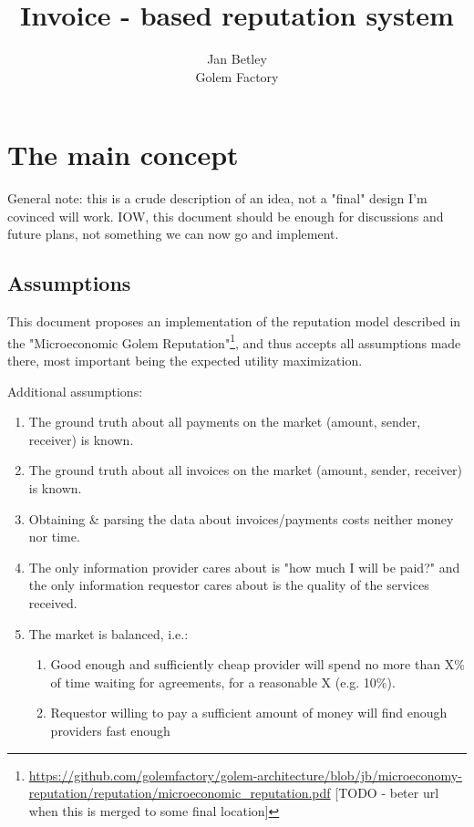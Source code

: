 \documentclass{article}
\title{Invoice - based reputation system}
\author{Jan Betley\\ Golem Factory}
\begin{document}
\maketitle

\section{The main concept}

General note: this is a crude description of an idea, not a "final" design I'm covinced will work.
IOW, this document should be enough for discussions and future plans, not something we can now go and implement.

\subsection{Assumptions}

This document proposes an implementation of the reputation model described in the "Microeconomic Golem Reputation"\footnote{
\href{https://github.com/golemfactory/golem-architecture/blob/jb/microeconomy-reputation/reputation/microeconomic\_reputation.pdf}
     {https://github.com/golemfactory/golem-architecture/blob/jb/microeconomy-reputation/reputation/microeconomic\_reputation.pdf}
[TODO - beter url when this is merged to some final location]}, and thus accepts all assumptions made there, most important being
the expected utility maximization.
    
Additional assumptions:

\begin{enumerate}
    \item The ground truth about all payments on the market (amount, sender, receiver) is known.
    \item The ground truth about all invoices on the market (amount, sender, receiver) is known.
    \item Obtaining \& parsing the data about invoices/payments costs neither money nor time.
    \item The only information provider cares about is "how much I will be paid?" and the only information requestor cares about
        is the quality of the services received.
    \item The market is balanced, i.e.: 
        \begin{enumerate}
            \item Good enough and sufficiently cheap provider will spend no more than X\% of time waiting for agreements, for a reasonable X (e.g. 10\%).
            \item Requestor willing to pay a sufficient amount of money will find enough providers fast enough
        \end{enumerate}
\end{enumerate}
\end{document}
